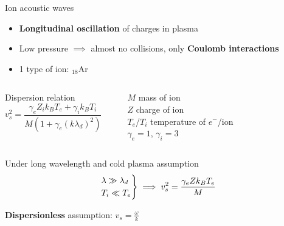 \documentclass[10pt]{beamer}
\newcommand{\electron}[0]{$e^{-}$}
\begin{document}
\begin{frame}{{Ion acoustic waves}}
    \begin{itemize}
        \item \textbf{Longitudinal oscillation} of charges in plasma
        \item Low pressure $\implies$ almost no collisions, only \textbf{Coulomb interactions}
        \item 1 type of ion: $_{18}$Ar
    \end{itemize}
    
    \vspace{0.5cm}
    \begin{columns}[T]
        \centering
        Dispersion relation \, 
        \begin{equation*}
            v_s^2 = \frac{\gamma_e Z_i k_B T_e + \gamma_i k_B T_i}{M(1+\gamma_e(k\lambda_d)^2)}
        \end{equation*}
        
        \rule{.2mm}{1.7cm}

        \vfill
        $M$ mass of ion \\
        $Z$ charge of ion \\
        $T_e$/$T_i$ temperature of \electron/ion \\
        $\gamma_e=1$, $\gamma_i=3$
        \vfill
    \end{columns}

    \vspace{0.8cm}
    Under long wavelength and cold plasma assumption
    \begin{equation*}
        \begin{rcases}
            \lambda \gg \lambda_d \\
            T_i \ll T_e
        \end{rcases}
        \implies v_s^2 = \frac{\gamma_e Z k_B T_e}{M}
    \end{equation*}

    \textbf{Dispersionless} assumption: $v_s = \frac{\omega}{k}$
\end{frame}
\end{document}
